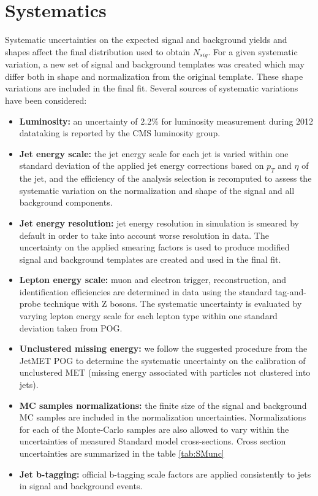 
\section{Systematics}

Systematic uncertainties on the expected signal and background yields and shapes affect
the final distribution used to obtain $N_{sig}$. For a given systematic variation, a new set of signal and background templates was created which may differ both in shape and normalization from the original template.  These shape variations are included in the final fit. Several sources of systematic variations have been considered:

\begin{itemize}
        \item{\textbf{Luminosity:}}
        an uncertainty of 2.2\% for luminosity measurement during 2012 datataking is reported by the CMS luminosity group.
        \item{\textbf{Jet energy scale:}}
        the jet energy scale for each jet is varied within one standard deviation of the applied jet energy corrections based on $p_T$ and $\eta$ of the jet, and the efficiency of the analysis selection is recomputed to assess the systematic variation on the normalization and shape of the signal and all background components.
        \item{\textbf{Jet energy resolution:}}
        jet energy resolution in simulation is smeared by default in order to take into account worse resolution in data. The uncertainty on the applied smearing factors is used to produce modified signal and background templates are created and used in the final fit.
        \item{\textbf{Lepton energy scale:}}
        muon and electron trigger, reconstruction, and identification efficiencies are determined in data using the standard tag-and-probe technique with Z bosons. The systematic uncertainty is evaluated by varying lepton energy scale for each lepton type within one standard deviation taken from POG.
        \item{\textbf{Unclustered missing energy:}}
        we follow the suggested procedure from the JetMET POG to determine the systematic uncertainty on the calibration of unclustered MET (missing energy associated with particles not clustered into jets).
        \item{\textbf{MC samples normalizations:}}
        the finite size of the signal and background MC samples are included in the normalization uncertainties. Normalizations for each of the Monte-Carlo samples are also allowed to vary within the uncertainties of measured Standard model cross-sections. Cross section uncertainties are summarized in the table \ref{tab:SMunc}
        \item{\textbf{Jet b-tagging:}}
        official b-tagging scale factors are applied consistently to jets in signal and background events.
\end{itemize}


